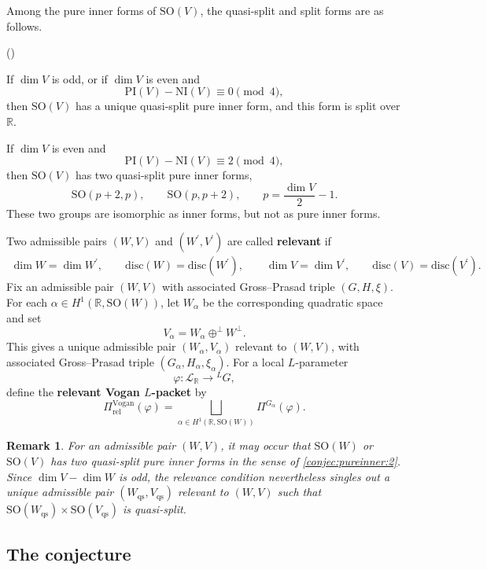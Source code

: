 \documentclass[12pt]{amsart}
\numberwithin{equation}{subsection}
\newcounter{keepeqno}
\newenvironment{num}
 {\setcounter{keepeqno}{\value{equation}}%
  \begin{list}{(\theequation)}{\usecounter{equation}}%
  \setcounter{equation}{\value{keepeqno}}}
 {\end{list}}
\newcommand{\BR}{{\mathbb {R}}}
\newcommand{\CL}{{\mathcal {L}}}
\newcommand{\disc}{{\mathrm{disc }}}
\newcommand{\SO}{{\mathrm{SO}}}
\def\alp{{\alpha}}
\def\LG{{}^{L}G}
\def\vphi{\varphi}
\def\p{\prime}
\def\Vg{\mathrm{Vogan}}
\def\rel{\mathrm{rel}}
\def\qs{\mathrm{qs}}
\def\PI{\mathrm{PI}}
\def\NI{\mathrm{NI}}
\def\SO{\mathrm{SO}}
\newtheorem{rmk}[thm]{Remark}
\begin{document}
Among the pure inner forms of $\SO(V)$, the quasi-split and split forms are as
follows.
\begin{num}
\item\label{conjec:pureinner:1}
If $\dim V$ is odd, or if $\dim V$ is even and
\[
\PI(V)-\NI(V)\equiv 0\pmod{4},
\]
then $\SO(V)$ has a unique quasi-split pure inner form, and this form is split
over $\BR$.

\item\label{conjec:pureinner:2}
If $\dim V$ is even and
\[
\PI(V)-\NI(V)\equiv 2\pmod{4},
\]
then $\SO(V)$ has two quasi-split pure inner forms,
\[
\SO(p+2,p),\qquad \SO(p,p+2),
\qquad p=\frac{\dim V}{2}-1.
\]
These two groups are isomorphic as inner forms, but not as pure inner forms.
\end{num}

Two admissible pairs $(W,V)$ and $(W^\p,V^\p)$ are called
\textbf{relevant} if
\begin{align*}
\dim W=\dim W^\p,\qquad
\disc(W)=\disc(W^\p),\qquad
\dim V=\dim V^\p,\qquad
\disc(V)=\disc(V^\p).
\end{align*}
Fix an admissible pair $(W,V)$ with associated Gross--Prasad triple
$(G,H,\xi)$. For each $\alp\in H^1(\BR,\SO(W))$, let $W_\alp$ be the
corresponding quadratic space and set
\[
V_\alp=W_\alp\oplus^\perp W^\perp.
\]
This gives a unique admissible pair $(W_\alp,V_\alp)$ relevant to $(W,V)$, with
associated Gross--Prasad triple $(G_\alp,H_\alp,\xi_\alp)$. For a local
$L$-parameter
\[
\vphi:\CL_\BR\to \LG,
\]
define the \textbf{relevant Vogan $L$-packet} by
\begin{equation}\label{eq:relvgpacket}
\Pi^{\Vg}_\rel(\vphi)
=
\bigsqcup_{\alp\in H^1(\BR,\SO(W))}
\Pi^{G_\alp}(\vphi).
\end{equation}

\begin{rmk}\label{rmk:uniqueqsggp}
For an admissible pair $(W,V)$, it may occur that $\SO(W)$ or $\SO(V)$ has two
quasi-split pure inner forms in the sense of \eqref{conjec:pureinner:2}. Since
$\dim V-\dim W$ is odd, the relevance condition nevertheless singles out a
unique admissible pair $(W_\qs,V_\qs)$ relevant to $(W,V)$ such that
$\SO(W_\qs)\times \SO(V_\qs)$ is quasi-split.
\end{rmk}

\subsection{The conjecture}\label{subsec:conjecofggp}
\end{document}
